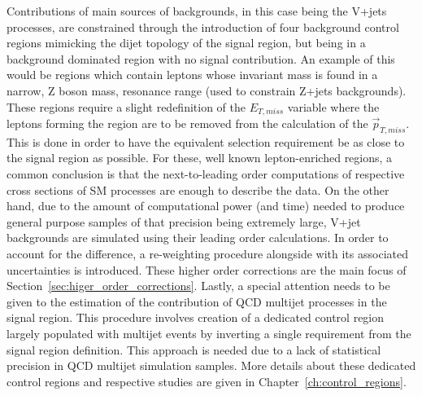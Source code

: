 \hspace{10pt} Contributions of main sources of backgrounds, in this case being the V+jets processes, are constrained through the introduction of four background control regions mimicking the dijet topology of the signal region, but being in a background dominated region with no signal contribution. An example of this would be regions which contain leptons whose invariant mass is found in a narrow, Z boson mass, resonance range (used to constrain Z+jets backgrounds). These regions require a slight redefinition of the $E_{T,miss}$ variable where the leptons forming the region are to be removed from the calculation of the $\vec{p}_{T,miss}$. This is done in order to have the equivalent selection requirement be as close to the signal region as possible. For these, well known lepton-enriched regions, a common conclusion is that the next-to-leading order computations of respective cross sections of SM processes are enough to describe the data. On the other hand, due to the amount of computational power (and time) needed to produce general purpose samples of that precision being extremely large, V+jet backgrounds are simulated using their leading order calculations. In order to account for the difference, a re-weighting procedure alongside with its associated uncertainties is introduced. These higher order corrections are the main focus of Section~\ref{sec:higer_order_corrections}. Lastly, a special attention needs to be given to the estimation of the contribution of QCD multijet processes in the signal region. This procedure involves creation of a dedicated control region largely populated with multijet events by inverting a single requirement from the signal region definition. This approach is needed due to a lack of statistical precision in QCD multijet simulation samples. More details about these dedicated control regions and respective studies are given in Chapter~\ref{ch:control_regions}.

